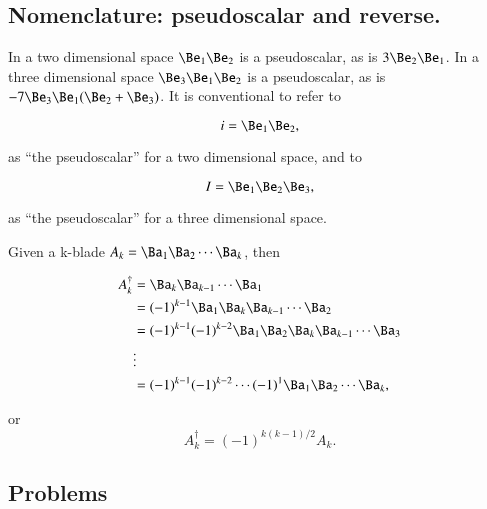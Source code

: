 \subsection{Nomenclature: pseudoscalar and reverse.}


In a two dimensional space \( \Be_1 \Be_2 \) is a pseudoscalar, as is \( 3 \Be_2 \Be_1 \).  In a three dimensional space
\( \Be_3 \Be_1 \Be_2 \) is a pseudoscalar, as is \( - 7 \Be_3 \Be_1 (\Be_2 + \Be_3 ) \).  
It is conventional to refer to

\begin{dmath}\label{eqn:definitions:320}
i = \Be_1 \Be_2,
\end{dmath}

as ``the pseudoscalar'' for a two dimensional space, and to

\begin{dmath}\label{eqn:definitions:340}
I = \Be_1 \Be_2 \Be_3,
\end{dmath}

as ``the pseudoscalar'' for a three dimensional space.



Given a k-blade \( A_k = \Ba_1 \Ba_2 \cdots \Ba_k \), then

\begin{dmath}\label{eqn:scalarPermutation:81}
\begin{aligned}
A_k^\dagger
&= \Ba_k \Ba_{k-1} \cdots \Ba_1 \\
&= (-1)^{k-1} \Ba_1 \Ba_k \Ba_{k-1} \cdots \Ba_2 \\
&= (-1)^{k-1} (-1)^{k-2} \Ba_1 \Ba_2 \Ba_k \Ba_{k-1} \cdots \Ba_3 \\
&\vdots \\
&= (-1)^{k-1} (-1)^{k-2} \cdots (-1)^1 \Ba_1 \Ba_2 \cdots \Ba_k,
\end{aligned}
\end{dmath}

or
\begin{dmath}\label{eqn:scalarPermutation:101}
A_k^\dagger = (-1)^{k(k-1)/2} A_k.
\end{dmath}

\subsection{Problems}



